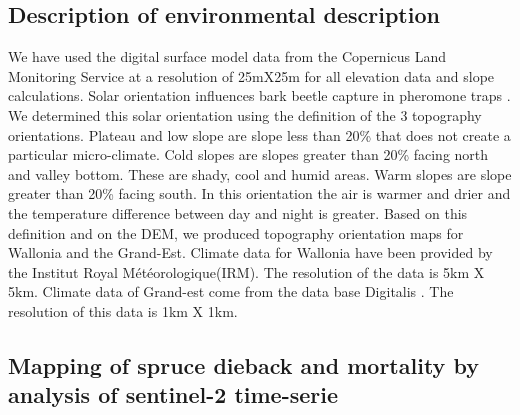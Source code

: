 \documentclass[3p,procedia]{elsarticle}
\begin{document}



\subsection{Description of environmental description}


We have used the digital surface model data from the Copernicus Land Monitoring Service \citep{DEM_copernicus}  at a resolution of 25mX25m for all elevation data and slope calculations.
Solar orientation influences bark beetle capture in pheromone traps \citep{AFR64}.
We determined this solar orientation using the \cite{Delvaux_galoux} definition of the 3 topography orientations.
Plateau and low slope are slope less than  20\% that does not create a particular micro-climate. 
Cold slopes are slopes greater than  20\% facing north and valley bottom. 
These are shady, cool and humid areas. 
Warm slopes are slope greater than  20\% facing south. 
In this orientation the air is warmer and drier and the temperature difference between day and night is greater.
Based on this definition and on the DEM, we produced topography orientation  maps for Wallonia and the Grand-Est.
Climate data for Wallonia have been provided by the Institut Royal Météorologique(IRM). The resolution of the data is 5km X 5km. Climate data of  Grand-est come from the data base Digitalis \citep{piedallu_presentation_2014}. The resolution of this data is 1km X 1km.


\subsection{Mapping of spruce dieback and mortality by analysis of sentinel-2 time-serie}
\end{document}
